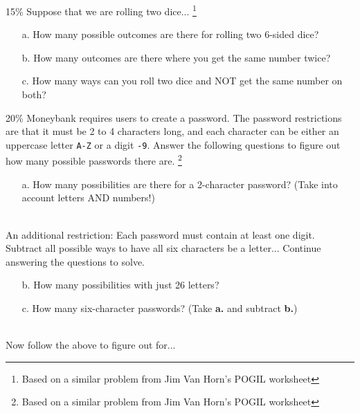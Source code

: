 \documentclass[a4paper,12pt]{book}
\begin{document}
        \begin{question}{7}{15\%}
            Suppose that we are rolling two dice...
            \footnote{Based on a similar problem from Jim Van Horn's POGIL worksheet}
        \end{question}

        \begin{enumerate}
            \item[a.] How many possible outcomes are there for rolling two 6-sided dice?
            \item[b.] How many outcomes are there where you get the same number twice?
            \item[c.] How many ways can you roll two dice and NOT get the same number on both?
        \end{enumerate}

        \newpage
        \begin{question}{8}{20\%}
            Moneybank requires users to create a password. The password
            restrictions are that it must be 2 to 4 characters long, and
            each character can be either an uppercase letter \texttt{\lbrack A-Z\rbrack}
            or a digit \texttt{-9\rbrack}. Answer the following questions
            to figure out how many possible passwords there are.
            \footnote{Based on a similar problem from Jim Van Horn's POGIL worksheet}
        \end{question}

        \begin{enumerate}
            \item[a.] How many possibilities are there for a 2-character password?
                (Take into account letters AND numbers!)
        \end{enumerate}
        ~\\ An additional restriction: Each password must contain at least one digit.
        Subtract all possible ways to have all six characters be a letter... Continue
        answering the questions to solve.
        
        \begin{enumerate}
            \item[b.] How many possibilities with just 26 letters?
            \item[c.] How many six-character passwords? (Take \textbf{a.} and subtract \textbf{b.})
        \end{enumerate}
        ~\\ Now follow the above to figure out for...
\end{document}
